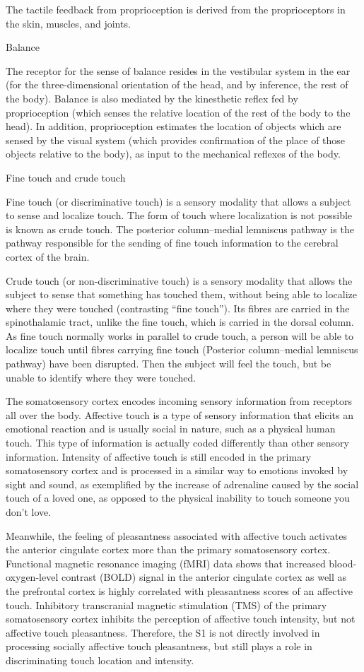 \documentclass[]{book}
\begin{document}
The tactile feedback from proprioception is derived from the proprioceptors in the skin, muscles, and joints.

Balance

The receptor for the sense of balance resides in the vestibular system in the ear (for the three-dimensional orientation of the head, and by inference, the rest of the body). Balance is also mediated by the kinesthetic reflex fed by proprioception (which senses the relative location of the rest of the body to the head). In addition, proprioception estimates the location of objects which are sensed by the visual system (which provides confirmation of the place of those objects relative to the body), as input to the mechanical reflexes of the body.

Fine touch and crude touch

Fine touch (or discriminative touch) is a sensory modality that allows a subject to sense and localize touch. The form of touch where localization is not possible is known as crude touch. The posterior column--medial lemniscus pathway is the pathway responsible for the sending of fine touch information to the cerebral cortex of the brain.

Crude touch (or non-discriminative touch) is a sensory modality that allows the subject to sense that something has touched them, without being able to localize where they were touched (contrasting ``fine touch''). Its fibres are carried in the spinothalamic tract, unlike the fine touch, which is carried in the dorsal column. As fine touch normally works in parallel to crude touch, a person will be able to localize touch until fibres carrying fine touch (Posterior column--medial lemniscus pathway) have been disrupted. Then the subject will feel the touch, but be unable to identify where they were touched.

The somatosensory cortex encodes incoming sensory information from receptors all over the body. Affective touch is a type of sensory information that elicits an emotional reaction and is usually social in nature, such as a physical human touch. This type of information is actually coded differently than other sensory information. Intensity of affective touch is still encoded in the primary somatosensory cortex and is processed in a similar way to emotions invoked by sight and sound, as exemplified by the increase of adrenaline caused by the social touch of a loved one, as opposed to the physical inability to touch someone you don't love.

Meanwhile, the feeling of pleasantness associated with affective touch activates the anterior cingulate cortex more than the primary somatosensory cortex. Functional magnetic resonance imaging (fMRI) data shows that increased blood-oxygen-level contrast (BOLD) signal in the anterior cingulate cortex as well as the prefrontal cortex is highly correlated with pleasantness scores of an affective touch. Inhibitory transcranial magnetic stimulation (TMS) of the primary somatosensory cortex inhibits the perception of affective touch intensity, but not affective touch pleasantness. Therefore, the S1 is not directly involved in processing socially affective touch pleasantness, but still plays a role in discriminating touch location and intensity.
\end{document}
